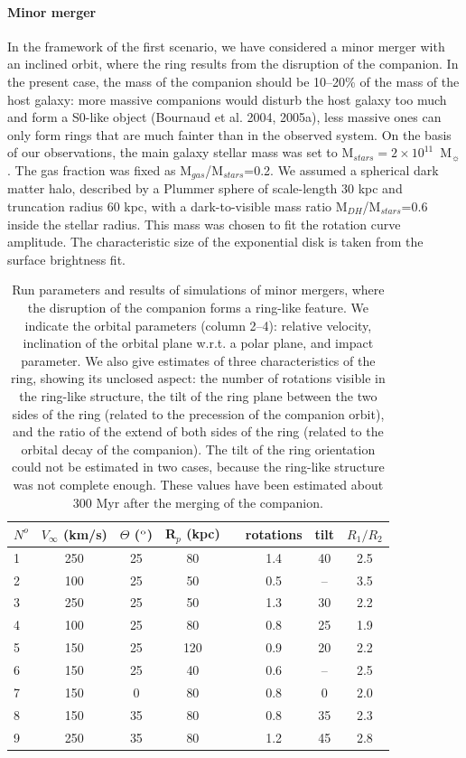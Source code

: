 \documentclass[]{aa}
\begin{document}
\paragraph{Minor merger}
In the framework of the first scenario, we have considered a minor 
merger with an inclined orbit, where the ring results from the 
disruption of the companion. In the present case, the mass of the 
companion should be 10--20\% of the mass of the host galaxy: more 
massive companions would disturb the host galaxy too much and 
form a S0-like object (Bournaud et al. 2004, 2005a), less massive ones can 
only form rings that are much fainter than in the observed system. 
On the basis of our observations, the main galaxy stellar mass
was set to M$_{stars}=2 \times 10^{11}$~M$_{\sun}$. 
The gas fraction was fixed as M$_{gas}$/M$_{stars}$=0.2.
We assumed a spherical dark matter halo, described by a Plummer 
sphere of scale-length 30 kpc and truncation radius 60 kpc, 
with a dark-to-visible mass ratio M$_{DH}$/M$_{stars}$=0.6 inside 
the stellar radius. This mass was chosen to fit the rotation curve 
amplitude. The characteristic size of the exponential disk is taken 
from the surface brightness fit. 

\begin{table}
\centering
\begin{tabular}{lccccccc}
\hline
\hline
$N^o$&$V_{\infty}$ (km/s)& $\Theta$ ($^{\rm o}$) & R$_p$ (kpc) & & rotations & tilt & $R_1/R_2$ \\
\hline
1 & 250 & 25 & 80  & & 1.4 & 40 & 2.5 \\
2 & 100 & 25 & 50  & & 0.5 & -- & 3.5 \\
3 & 250 & 25 & 50  & & 1.3 & 30 & 2.2 \\
4 & 100 & 25 & 80  & & 0.8 & 25 & 1.9 \\
5 & 150 & 25 & 120 & & 0.9 & 20 & 2.2 \\
6 & 150 & 25 & 40  & & 0.6 & -- & 2.5 \\
7 & 150 &  0 & 80  & & 0.8 & 0  & 2.0 \\
8 & 150 & 35 & 80  & & 0.8 & 35 & 2.3 \\
9 & 250 & 35 & 80  & & 1.2 & 45 & 2.8 \\
\hline
\end{tabular}
\caption{Run parameters and results of simulations of minor mergers, where the 
disruption of the companion forms a ring-like feature. We indicate the orbital 
parameters (column 2--4): relative velocity, inclination of the orbital plane w.r.t. 
a polar plane, and impact parameter. We also give estimates of three characteristics 
of the ring, showing its unclosed aspect: the number of rotations visible in the 
ring-like structure, the tilt of the ring plane between the two sides of the ring 
(related to the precession of the companion orbit), and the ratio of the extend of 
both sides of the ring (related to the orbital decay of the companion). The tilt 
of the ring orientation could not be estimated in two cases, because the ring-like 
structure was not complete enough. These values have been estimated about 300 Myr 
after the merging of the companion.}
\end{table}
\end{document}
